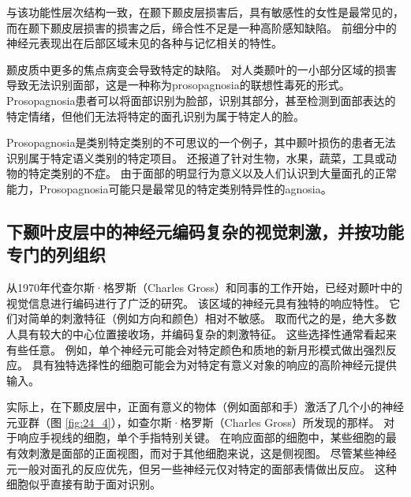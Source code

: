 与该功能性层次结构一致，在颞下颞皮层损害后，具有敏感性的女性是最常见的，而在颞下颞皮层损害的损害之后，缔合性不足是一种高阶感知缺陷。
前细分中的神经元表现出在后部区域未见的各种与记忆相关的特性。


颞皮质中更多的焦点病变会导致特定的缺陷。
对人类颞叶的一小部分区域的损害导致无法识别面部，这是一种称为prosopagnosia的联想性毒死的形式。 
Prosopagnosia患者可以将面部识别为脸部，识别其部分，甚至检测到面部表达的特定情绪，但他们无法将特定的面孔识别为属于特定人的脸。


Prosopagnosia是类别特定类别的不可思议的一个例子，其中颞叶损伤的患者无法识别属于特定语义类别的特定项目。
还报道了针对生物，水果，蔬菜，工具或动物的特定类别的不症。
由于面部的明显行为意义以及人们认识到大量面孔的正常能力，Prosopagnosia可能只是最常见的特定类别特异性的agnosia。



\subsection{下颞叶皮层中的神经元编码复杂的视觉刺激，并按功能专门的列组织}
从1970年代查尔斯·格罗斯（Charles Gross）和同事的工作开始，已经对颞叶中的视觉信息进行编码进行了广泛的研究。
该区域的神经元具有独特的响应特性。
它们对简单的刺激特征（例如方向和颜色）相对不敏感。 
取而代之的是，绝大多数人具有较大的中心位置接收场，并编码复杂的刺激特征。
这些选择性通常看起来有些任意。
例如，单个神经元可能会对特定颜色和质地的新月形模式做出强烈反应。
具有独特选择性的细胞可能会为对特定有意义对象的响应的高阶神经元提供输入。


实际上，在下颞皮层中，正面有意义的物体（例如面部和手）激活了几个小的神经元亚群（图 \ref{fig:24_4}），如查尔斯·格罗斯（Charles Gross）所发现的那样。
对于响应手视线的细胞，单个手指特别关键。
在响应面部的细胞中，某些细胞的最有效刺激是面部的正面视图，而对于其他细胞来说，这是侧视图。
尽管某些神经元一般对面孔的反应优先，但另一些神经元仅对特定的面部表情做出反应。
这种细胞似乎直接有助于面对识别。

